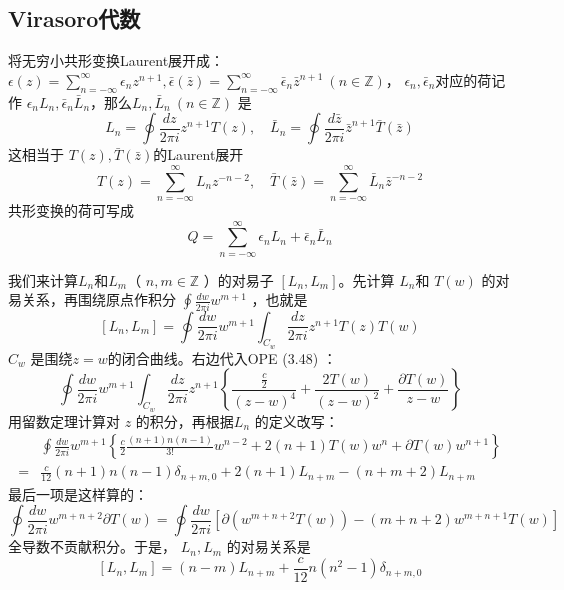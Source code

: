 \subsection{ Virasoro代数}

将无穷小共形变换Laurent展开成：$\epsilon(z)=\sum_{n=-\infty}^{\infty} \epsilon_{n} z^{n+1}, \bar{\epsilon}(\bar{z})=\sum_{n=-\infty}^{\infty} \bar{\epsilon}_{n} \bar{z}^{n+1}\ (n\in \mathbb{Z}) $， $\epsilon_n,\bar{\epsilon}_n $对应的荷记作 $\epsilon_nL_n,\bar{\epsilon}_n\bar{L}_n $，那么$ L_n,\bar{L}_n\ (n\in \mathbb{Z})$ 是
\begin{equation}
	L_{n}=\oint \frac{d z}{2 \pi i} z^{n+1} T(z), \quad \bar{L}_{n}=\oint \frac{d \bar{z}}{2 \pi i} \bar{z}^{n+1} \bar{T}(\bar{z})
\end{equation}
这相当于 $T(z),\bar{T}(\bar{z}) $的Laurent展开
\begin{equation}
	T(z)=\sum_{n=-\infty}^{\infty} L_{n} z^{-n-2}, \quad \bar{T}(\bar{z})=\sum_{n=-\infty}^{\infty} \bar{L}_{n} \bar{z}^{-n-2}
\end{equation}
共形变换的荷可写成
\begin{equation}
	Q=\sum_{n=-\infty}^{\infty} \epsilon_{n} L_{n}+\bar{\epsilon}_{n} \bar{L}_{n}
\end{equation}

我们来计算$ L_n 和 L_m $（ $n,m\in \mathbb{Z}$ ）的对易子 $[L_n,L_m] $。先计算 $L_n $和 $T(w)$ 的对易关系，再围绕原点作积分 $\oint \frac{d w}{2 \pi i} w^{m+1}$ ，也就是
\begin{equation}
	\left[L_{n}, L_{m}\right]=\oint \frac{d w}{2 \pi i} w^{m+1} \int_{C_{w}} \frac{d z}{2 \pi i} z^{n+1} T(z) T(w)
\end{equation}
$C_w$ 是围绕$ z=w $的闭合曲线。右边代入OPE (3.48) ：
\[
	\oint \frac{d w}{2 \pi i} w^{m+1} \int_{C_{w}} \frac{d z}{2 \pi i} z^{n+1}\left\{\frac{\frac{c}{2}}{(z-w)^{4}}+\frac{2 T(w)}{(z-w)^{2}}+\frac{\partial T(w)}{z-w}\right\}
\]
用留数定理计算对 $z$ 的积分，再根据$ L_n$ 的定义改写：
\begin{equation}
	\begin{aligned} &\oint \frac{d w}{2 \pi i} w^{m+1}\left\{\frac{c}{2} \frac{(n+1) n(n-1)}{3 !} w^{n-2}+2(n+1) T(w) w^{n}+\partial T(w) w^{n+1}\right\} \\ =&\frac{c}{12}(n+1) n(n-1) \delta_{n+m, 0}+2(n+1) L_{n+m}-(n+m+2) L_{n+m} \end{aligned}
\end{equation}
最后一项是这样算的：
\[
\oint \frac{d w}{2 \pi i} w^{m+n+2} \partial T(w)=\oint \frac{d w}{2 \pi i} \left[\partial\left(w^{m+n+2} T(w)\right)-(m+n+2) w^{m+n+1} T(w)\right]
\]
全导数不贡献积分。于是， $L_n,L_m$ 的对易关系是
\begin{equation}
	\left[L_{n}, L_{m}\right]=(n-m) L_{n+m}+\frac{c}{12} n\left(n^{2}-1\right) \delta_{n+m, 0}
\end{equation}

